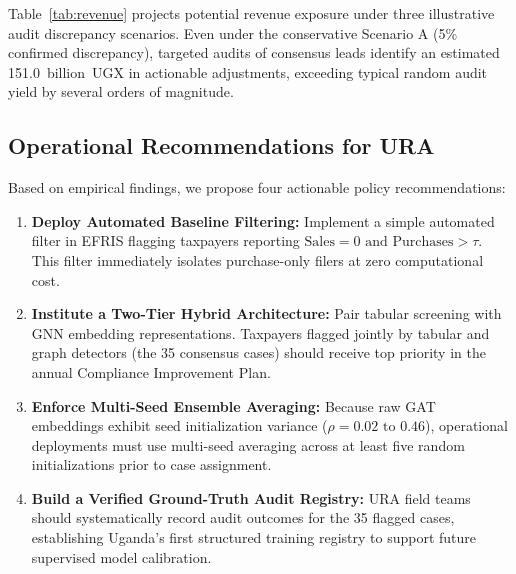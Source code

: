 \documentclass[10pt,twocolumn]{article}
\begin{document}
\begin{table}[htb]
  \centering
  \small
  \caption{Potential revenue recovery scenarios across the 3,019.8~billion~UGX input VAT consensus exposure base.}
  \label{tab:revenue}
\end{table}

Table~\ref{tab:revenue} projects potential revenue exposure under three illustrative audit discrepancy scenarios. Even under the conservative Scenario A (5\% confirmed discrepancy), targeted audits of consensus leads identify an estimated 151.0~billion~UGX in actionable adjustments, exceeding typical random audit yield by several orders of magnitude.

\subsection{Operational Recommendations for URA}
Based on empirical findings, we propose four actionable policy recommendations:
\begin{enumerate}
  \item \textbf{Deploy Automated Baseline Filtering:} Implement a simple automated filter in EFRIS flagging taxpayers reporting $\text{Sales} = 0 \text{ and } \text{Purchases} > \tau$. This filter immediately isolates purchase-only filers at zero computational cost.
  \item \textbf{Institute a Two-Tier Hybrid Architecture:} Pair tabular screening with GNN embedding representations. Taxpayers flagged jointly by tabular and graph detectors (the 35 consensus cases) should receive top priority in the annual Compliance Improvement Plan.
  \item \textbf{Enforce Multi-Seed Ensemble Averaging:} Because raw GAT embeddings exhibit seed initialization variance ($\rho = 0.02 \text{ to } 0.46$), operational deployments must use multi-seed averaging across at least five random initializations prior to case assignment.
  \item \textbf{Build a Verified Ground-Truth Audit Registry:} URA field teams should systematically record audit outcomes for the 35 flagged cases, establishing Uganda's first structured training registry to support future supervised model calibration.
\end{enumerate}
\end{document}
